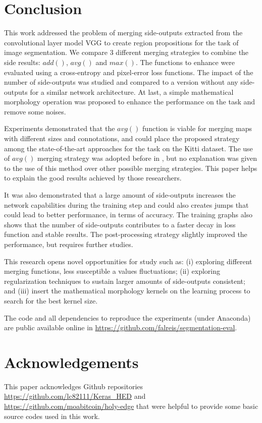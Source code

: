 \section{Conclusion}
\label{sec:conclusion}

This work addressed the problem of merging side-outputs extracted from the convolutional layer model VGG to create region propositions for the task of image segmentation. We compare 3 different merging strategies to combine the side results: $add()$, $avg()$ and $max()$. The functions to enhance were evaluated using a cross-entropy and pixel-error loss functions. The impact of the number of side-outputs was studied and compared to a version without any side-outputs for a similar network architecture. At last, a simple mathematical morphology operation was proposed to  enhance the performance on the task and remove some noises. 

Experiments demonstrated that the $avg()$ function is viable for merging maps with different sizes and connotations, and could place the proposed strategy among the state-of-the-art approaches for the task on the Kitti dataset. The use of $avg()$ merging strategy was adopted before in \cite{liu2017}, but no explanation was given to the use of this method over other possible merging strategies. This paper helps to explain the good results achieved by those researchers.

It was also demonstrated that a large amount of side-outputs increases the network capabilities during the training step and could also creates jumps that could lead to better performance, in terms of accuracy. The training graphs also shows that the number of side-outputs contributes to a faster decay in loss function and stable results. The post-processing strategy slightly improved the performance, but requires further studies.

This research opens novel opportunities for study such as: (i) exploring different merging functions, less susceptible a values fluctuations;  (ii) exploring regularization techniques to sustain larger amounts of side-outputs consistent; and (iii) insert the mathematical morphology kernels on the learning process to search for the best kernel size. 
 
The code and all dependencies to reproduce the experiments (under Anaconda) are public available online in \url{https://github.com/falreis/segmentation-eval}. 

\section{Acknowledgements}
\label{sec:acknowledgements}

This paper acknowledges Github repositories \url{https://github.com/lc82111/Keras_HED} and \url{https://github.com/moabitcoin/holy-edge} that were helpful to provide some basic source codes used in this work.
